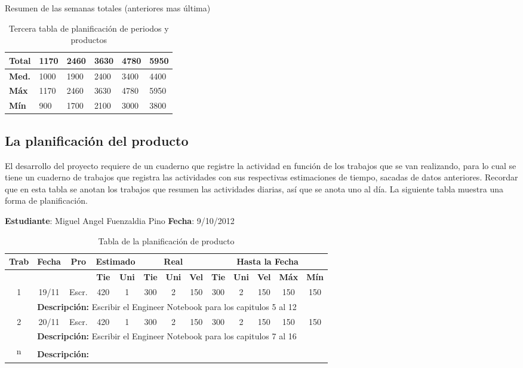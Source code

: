 \documentclass[a4paper,12pt,openany,oneside]{book}
\begin{document}
Resumen de las semanas totales (anteriores mas última)
\begin{table}
\begin{tabular}{| l | l | l | l | l | l |}
\hline
\textbf{Total} & 1170 & 2460 & 3630 & 4780 & 5950 \\
\hline
\textbf{Med.} & 1000 & 1900 & 2400 & 3400 & 4400 \\
\hline
\textbf{Máx} & 1170 & 2460 & 3630 & 4780 & 5950 \\
\hline
\textbf{Mín} & 900 & 1700 & 2100 & 3000 & 3800 \\
\hline
\end{tabular}
\caption{Tercera tabla de planificación de periodos y productos}
\end{table}
\subsection{La planificación del producto}
El desarrollo del proyecto requiere de un cuaderno que registre la actividad en función de los trabajos que se van realizando, para lo cual se tiene un cuaderno de trabajos que registra las actividades con sus respectivas estimaciones de tiempo, sacadas de datos anteriores. Recordar que en esta tabla se anotan los trabajos que resumen las actividades diarias, así que se anota uno al día. La siguiente tabla muestra una forma de planificación.
\newpage
\begin{table}
\textbf{Estudiante}: Miguel Angel Fuenzaldia Pino     \textbf{Fecha}: 9/10/2012\\
\begin{tabular}{|c|c|c|c|c|c|c|c|c|c|c|c|c|}
\hline
\textbf{Trab} & \textbf{Fecha} & \textbf{Pro} & \multicolumn{2}{|c|}{\textbf{Estimado}} & \multicolumn{3}{|c|}{\textbf{Real}} & \multicolumn{5}{|c|}{\textbf{Hasta la Fecha}} \\
\hline
 & & & \textbf{Tie} & \textbf{Uni} & \textbf{Tie} & \textbf{Uni} & \textbf{Vel} & \textbf{Tie} & \textbf{Uni} & \textbf{Vel} & \textbf{Máx} & \textbf{Mín} \\
\hline
\multirow{2}{*}{1} & 19/11 & Escr. & 420 & 1 & 300 & 2 & 150 & 300 & 2 & 150 & 150 & 150 \\
\cline{2-13} & \multicolumn{12}{|l|}{\textbf{Descripción:} Escribir el Engineer Notebook para los capitulos 5 al 12}\\
\hline
\multirow{2}{*}{2} & 20/11 & Escr. & 420 & 1 & 300 & 2 & 150 & 300 & 2 & 150 & 150 & 150 \\
\cline{2-13} & \multicolumn{12}{|l|}{\textbf{Descripción:} Escribir el Engineer Notebook para los capitulos 7 al 16}\\
\hline
\multirow{2}{*}{n} & & & & & & & & & & & & \\
\cline{2-13} & \multicolumn{12}{|l|}{\textbf{Descripción:}}\\
\hline
\end{tabular}
\caption{Tabla de la planificación de producto}
\end{table}
\end{document}
